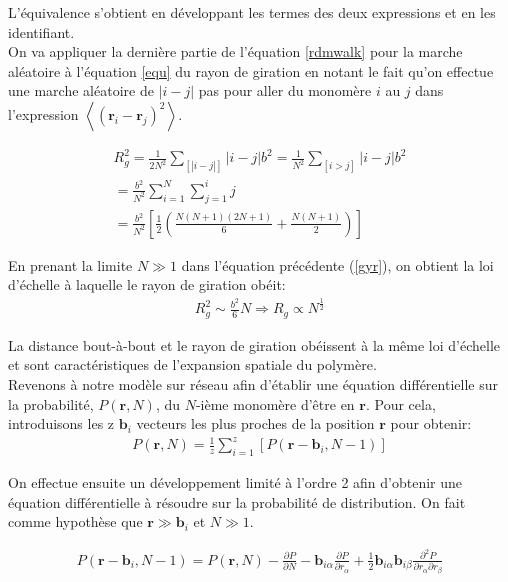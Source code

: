  L'équivalence s'obtient en développant les termes des deux expressions et en les identifiant.\\


On va appliquer la dernière partie de l'équation \ref{rdmwalk} pour la marche aléatoire à l'équation \ref{equ} du rayon de giration en notant le fait qu'on effectue une marche aléatoire de $|i-j|$ pas pour aller du monomère $i$ au $j$ dans l'expression $\left<(\textbf{r}_i - \textbf{r}_j)^2\right>$.

\begin{gather}
R_g^2\text{}=\text{}\frac{1}{2N^2}\sum_{[|i-j|]} |i-j| b^2=\text{}\frac{1}{N^2}\sum_{[i>j]} |i-j| b^2\nonumber \\
=\text{}\frac{b^2}{N^2} \sum_{i=1}^N \sum_{j=1}^{i} j \\
 = \text{}\frac{b^2}{N^2}[\frac{1}{2}(\frac{N(N+1)(2N+1)}{6}+\frac{N(N+1)}{2})]\nonumber
\label{gyr}
\end{gather}

En prenant la limite $N \gg 1$ dans l'équation précédente (\ref{gyr}), on obtient la loi d'échelle à laquelle le rayon de giration obéit:
\begin{eqnarray}
R_g^2\text{}\sim\text{}\frac{b^2}{6}N \Rightarrow R_g\propto N^{\frac12}
\end{eqnarray}

La distance bout-à-bout et le rayon de giration obéissent à la même loi d'échelle et sont caractéristiques de l'expansion spatiale du polymère.\\


Revenons à notre modèle sur réseau afin d'établir une équation différentielle sur la probabilité, $P(\textbf{r},N)$, du $N$-ième monomère d'être en $\textbf{r}$. Pour cela, introduisons les z $\textbf{b}_i$  vecteurs les plus proches de la position $\textbf{r}$ pour obtenir:
\begin{eqnarray}
P(\textbf{r},N)= \frac{1}{z}\sum_{i=1}^{z} \left[P(\textbf{r}-\textbf{b}_i,N-1)\right]
\label{eqdifprob}
\end{eqnarray}

On effectue ensuite un développement limité à l'ordre 2 afin d'obtenir une équation différentielle à résoudre sur la probabilité de distribution. On fait comme hypothèse que $\textbf{r}\gg\textbf{b}_i$ et $N \gg 1$.

\begin{eqnarray}
P(\textbf{r}-\textbf{b}_i,N-1)=P(\textbf{r},N)- \frac{\partial P}{\partial N}-  \textbf{b}_{i\alpha} \frac{\partial P}{\partial r_{\alpha} } + \frac12 \textbf{b}_{i\alpha}\textbf{b}_{i\beta} \frac{\partial ^2 P}{\partial r_{\alpha}\partial r_{\beta} }
\end{eqnarray}

